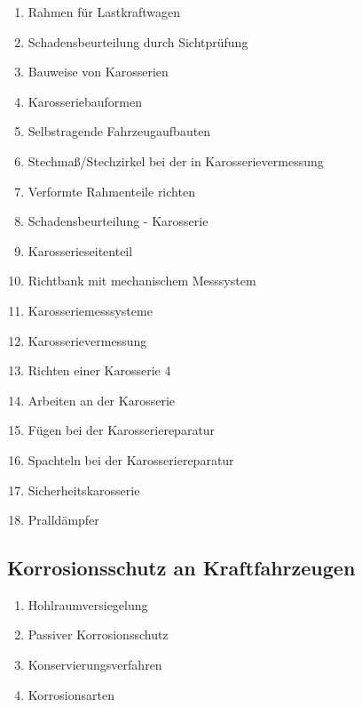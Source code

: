 \begin{enumerate}
\item
  Rahmen für Lastkraftwagen\\
\item
  Schadensbeurteilung durch Sichtprüfung\\
\item
  Bauweise von Karosserien\\
\item
  Karosseriebauformen\\
\item
  Selbstragende Fahrzeugaufbauten\\
\item
  Stechmaß/Stechzirkel bei der in Karosserievermessung\\
\item
  Verformte Rahmenteile richten\\
\item
  Schadensbeurteilung - Karosserie\\
\item
  Karosserieseitenteil\\
\item
  Richtbank mit mechanischem Messsystem\\
\item
  Karosseriemesssysteme\\
\item
  Karosserievermessung\\
\item
  Richten einer Karosserie 4
\item
  Arbeiten an der Karosserie\\
\item
  Fügen bei der Karosseriereparatur\\
\item
  Spachteln bei der Karosseriereparatur\\
\item
  Sicherheitskarosserie\\
\item
  Pralldämpfer
\end{enumerate}

\subsection{Korrosionsschutz an
Kraftfahrzeugen}\label{korrosionsschutz-an-kraftfahrzeugen}

\begin{enumerate}
\item
  Hohlraumversiegelung\\
\item
  Passiver Korrosionsschutz\\
\item
  Konservierungsverfahren\\
\item
  Korrosionsarten
\end{enumerate}

